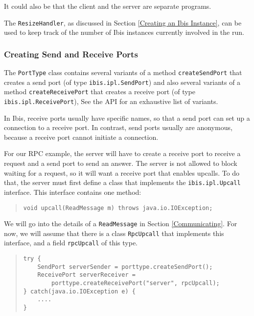 \documentclass[10pt]{article}
\begin{document}
It could also be that the client and the server are separate programs.

The \verb+ResizeHandler+, as discussed in Section
\ref{Creating an Ibis Instance}, can be used to keep track of the number
of Ibis instances currently involved in the run.

\subsubsection{Creating Send and Receive Ports}

The \verb+PortType+ class contains several variants of a method
\verb+createSendPort+ that creates a send port (of type
\verb+ibis.ipl.SendPort+) and
also several variants of a method \verb+createReceivePort+ that
creates a receive port (of type \verb+ibis.ipl.ReceivePort+),
See the API for an exhaustive list of variants.

In Ibis, receive ports usually have specific names, so that
a send port can set up a connection to a receive port. In contrast,
send ports usually are anonymous, because a receive port cannot
initiate a connection.

For our RPC example, the server will have to create a receive port
to receive a request and a send port to send an answer.
The server is not allowed to block waiting for a request, so it will
want a receive port that enables upcalls.
To do that, the server must first define a class that implements
the \verb+ibis.ipl.Upcall+ interface. This interface contains one
method:

\begin{quote}
\begin{verbatim}
void upcall(ReadMessage m) throws java.io.IOException;
\end{verbatim}
\end{quote}

We will go into the details of a \verb+ReadMessage+ in Section
\ref{Communicating}. For now, we will assume that there is a
class \verb+RpcUpcall+ that implements this interface, and
a field \verb+rpcUpcall+ of this type.

\begin{quote}
\begin{verbatim}
try {
    SendPort serverSender = porttype.createSendPort();
    ReceivePort serverReceiver =
        porttype.createReceivePort("server", rpcUpcall);
} catch(java.io.IOException e) {
    ....
}
\end{verbatim}
\end{quote}
\end{document}
